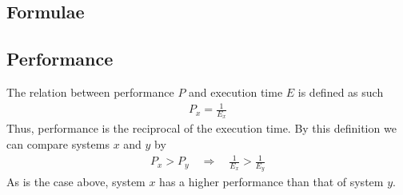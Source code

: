 %
%

\begin{appendices}
	\section{Formulae}
	\subsection{Performance}
	\label{appendix:formulae|sub:performance}
	The relation between performance $P$ and execution time $E$ is defined as
	such
	\begin{align*}
		P_x = \frac{1}{E_x}
	\end{align*}
	Thus, performance is the reciprocal of the execution time. By this
	definition we can compare systems $x$ and $y$ by
	\begin{align*}
		P_x > P_y \quad\Rightarrow\quad \frac{1}{E_x} > \frac{1}{E_y}
	\end{align*}
	As is the case above, system $x$ has a higher performance than that of
	system $y$.
\end{appendices}

